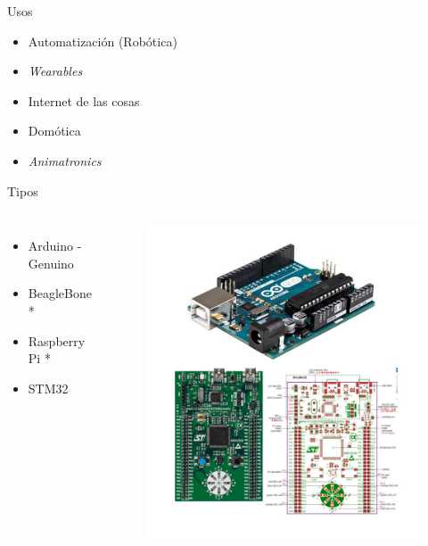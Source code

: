 \documentclass[10pt]{beamer}
\begin{document}
\begin{frame}{Usos}
	\begin{itemize}
		\item Automatización (Robótica)
        \item \textit{Wearables}
        \item Internet de las cosas
        \item Domótica
        \item \textit{Animatronics}
	\end{itemize}
\end{frame}

\begin{frame}{Tipos}
	\begin{columns}
            \begin{itemize}
                \item Arduino - Genuino
                \item BeagleBone \alert{*}
                \item Raspberry Pi \alert{*}
                \item STM32
            \end{itemize}
			\begin{center}
				\begin{figure}
					\includegraphics[width=1\textwidth]{img/micros.png}
				\end{figure}
			\end{center}
	\end{columns}
\end{frame}
\end{document}
